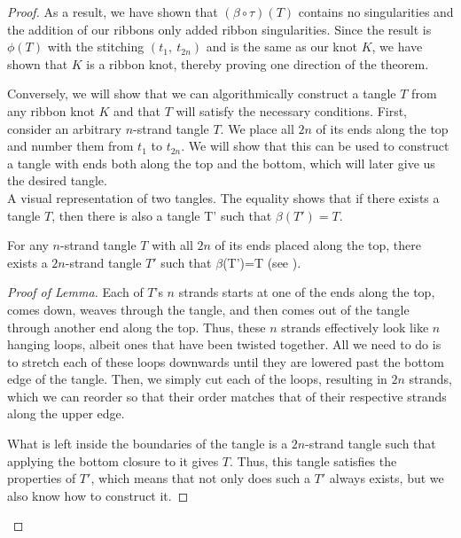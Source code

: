 \begin{paper}
\begin{proof}
As a result, we have shown that $(\beta\circ\tau)(T)$ contains no singularities
and the addition of our ribbons only added ribbon singularities.
Since the result is $\phi(T)$ with the stitching $(t_1,~t_{2n})$ and is the same
as our knot $K$, we have shown that $K$ is a ribbon knot, thereby proving one
direction of the theorem.

Conversely, we will show that we can algorithmically construct a tangle $T$ from
any ribbon knot $K$ and that $T$ will satisfy the necessary conditions.
First, consider an arbitrary $n$-strand tangle $T$.
We place all $2n$ of its ends along the top and number them from $t_1$ to
$t_{2n}$.
We will show that this can be used to construct a tangle with ends both along
the top and the bottom, which will later give us the desired tangle.\\

{A visual representation of two tangles.
The equality shows that if there exists a tangle $T$, then there is also a
tangle T' such that $\beta(T')=T$.}

{For any $n$-strand tangle $T$ with all $2n$ of its ends placed along the top,
there exists a $2n$-strand tangle $T'$ such that $\beta$(T')=T (see \figLemma).}
\begin{proof}[Proof of Lemma]
Each of $T$'s $n$ strands starts at one of the ends along the top, comes down,
weaves through the tangle, and then comes out of the tangle through another end
along the top.
Thus, these $n$ strands effectively look like $n$ hanging loops, albeit ones
that have been twisted together.
All we need to do is to stretch each of these loops downwards until they are
lowered past the bottom edge of the tangle.
Then, we simply cut each of the loops, resulting in $2n$ strands, which we can
reorder so that their order matches that of their respective strands along the
upper edge.

What is left inside the boundaries of the tangle is a $2n$-strand tangle such
that applying the bottom closure to it gives $T$.
Thus, this tangle satisfies the properties of $T'$, which means that not only
does such a $T'$ always exists, but we also know how to construct it.
\end{proof}


\end{proof}
\end{paper}
